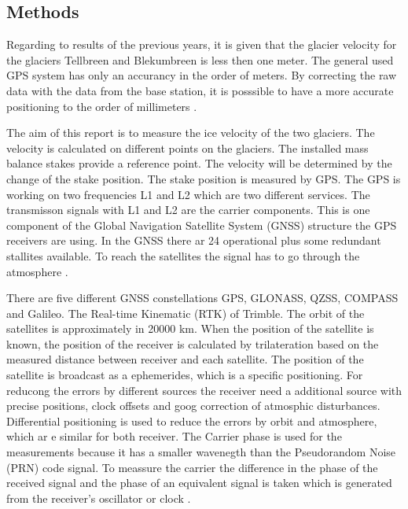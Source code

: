 
\subsection{Methods}

Regarding to results of the previous years, it is given that the glacier velocity for the glaciers Tellbreen and Blekumbreen is less then one meter.
The general used GPS system has only an accurancy in the order of meters.
By correcting the raw data with the data from the base station, it is posssible to have a more accurate positioning to the order of millimeters \citep{UGPS}.
\medskip

The aim of this report is to measure the ice velocity of the two glaciers.
The velocity is calculated on different points on the glaciers. 
The installed mass balance stakes provide a reference point.
The velocity will be determined by the change of the stake position.
The stake position is measured by GPS. 
The GPS is working on two frequencies L1 and L2 which are two different services.
The transmisson signals with L1 and L2 are the carrier components. 
This is one component of the Global Navigation Satellite System (GNSS) structure the GPS receivers are using.
In the GNSS there ar 24 operational plus some redundant stallites available.
To reach the satellites the signal has to go through the atmosphere \citep{curcherdgps}.
\medskip

There are five different GNSS constellations GPS, GLONASS, QZSS, COMPASS and Galileo.
The Real-time Kinematic (RTK) of Trimble.
The orbit of the satellites is approximately in 20000 km.
When the position of the satellite is known, the position of the receiver is calculated by trilateration based on the measured distance between receiver and each satellite.
The position of the satellite is broadcast as a ephemerides, which is a specific positioning.
For reducong the errors by different sources the receiver need a additional source with precise positions, clock offsets and goog correction of atmosphic disturbances. 
Differential positioning is used to reduce the errors by orbit and atmosphere, which ar e similar for both receiver. 
The Carrier phase is used for the measurements because it has a smaller wavenegth than the Pseudorandom Noise (PRN) code signal.
To meassure the carrier the difference in the phase of the received signal and the phase of an equivalent signal is taken which is generated from the receiver’s oscillator or clock \citep{Trprocess}.
\medskip

